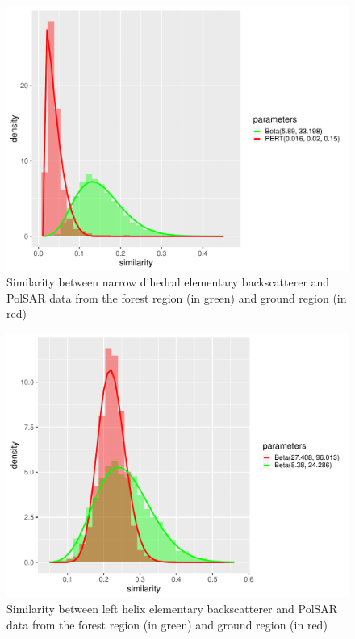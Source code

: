 \documentclass[conference]{IEEEtran}
\begin{document}
\begin{figure}[!ht]
    \centering
    \includegraphics[width = .9\linewidth, height = .7\linewidth]{../../../Figures/paper_19_05/nd.pdf}
    \caption{Similarity between narrow dihedral elementary backscatterer and PolSAR data from the forest region (in green) and ground region (in red)}
    \label{fig:nd}
\end{figure}

\begin{figure}[!ht]
    \centering
    \includegraphics[width = .9\linewidth, height = .7\linewidth]{../../../Figures/paper_19_05/lh.pdf}
    \caption{Similarity between left helix elementary backscatterer and PolSAR data from the forest region (in green) and ground region (in red)}
    \label{fig:lh}
\end{figure}
\end{document}
